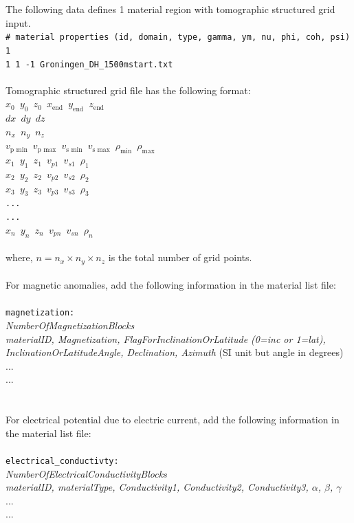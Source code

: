 The following data defines 1 material region with tomographic structured grid input.\\

\texttt{\# material properties (id, domain, type, gamma, ym, nu, phi, coh, psi)\\
1\\
1 1 -1 Groningen\_DH\_1500mstart.txt\\
}\\

Tomographic structured grid file has the following format:\\

\texttt{$x_0$ $y_0$ $z_0$ $x_\text{end}$ $y_\text{end}$ $z_\text{end}$\\
$dx$ $dy$ $dz$\\
$n_x$ $n_y$ $n_z$\\
$v_\text{p~min}$ $v_\text{p~max}$ $v_\text{s~min}$ $v_\text{s~max}$ $\rho_\text{min}$ $\rho_\text{max}$ \\
$x_1$ $y_1$ $z_1$ $v_{p1}$ $v_{s1}$ $\rho_1$\\
$x_2$ $y_2$ $z_2$ $v_{p2}$ $v_{s2}$ $\rho_2$\\
$x_3$ $y_3$ $z_3$ $v_{p3}$ $v_{s3}$ $\rho_3$\\
...\\
...\\
$x_n$ $y_n$ $z_n$ $v_{pn}$ $v_{sn}$ $\rho_n$\\
}\\

where, $n=n_x \times n_y \times n_z$ is the total number of grid points. 
\\
\\
For magnetic anomalies, add the following information in the material list file:\\
\\
\texttt{magnetization:}\\
\emph{NumberOfMagnetizationBlocks\\
materialID, Magnetization, FlagForInclinationOrLatitude (0=inc or 1=lat), InclinationOrLatitudeAngle, Declination, Azimuth} (SI unit but angle in degrees)\\
...\\
...\\
\\
\\
For electrical potential due to electric current, add the following information in the material list file:\\
\\
\texttt{electrical\_conductivty:}\\
\emph{NumberOfElectricalConductivityBlocks\\
materialID, materialType, Conductivity1, Conductivity2, Conductivity3, $\alpha$, $\beta$, $\gamma$}\\
...\\
...\\
\\

